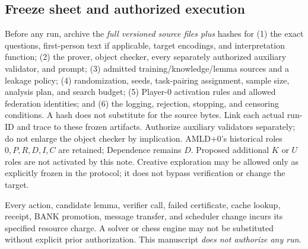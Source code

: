 \documentclass[11pt,letterpaper]{article}
\begin{document}
\subsection{Freeze sheet and authorized execution}
Before any run, archive the \emph{full versioned source files plus} hashes for (1) the exact questions, first-person text if applicable, target encodings, and interpretation function; (2) the prover, object checker, every separately authorized auxiliary validator, and prompt; (3) admitted training/knowledge/lemma sources and a leakage policy; (4) randomization, seeds, task-pairing assignment, sample size, analysis plan, and search budget; (5) Player-0 activation rules and allowed federation identities; and (6) the logging, rejection, stopping, and censoring conditions. A hash does not substitute for the source bytes. Link each actual run-ID and trace to these frozen artifacts. Authorize auxiliary validators separately; do not enlarge the object checker by implication. AMLD+0's historical roles $0,P,R,D,I,C$ are retained; Dependence remains $D$. Proposed additional $K$ or $U$ roles are not activated by this note. Creative exploration may be allowed only as explicitly frozen in the protocol; it does not bypass verification or change the target.

Every action, candidate lemma, verifier call, failed certificate, cache lookup, receipt, BANK promotion, message transfer, and scheduler change incurs its specified resource charge. A solver or chess engine may not be substituted without explicit prior authorization. This manuscript \emph{does not authorize any run}.
\end{document}
